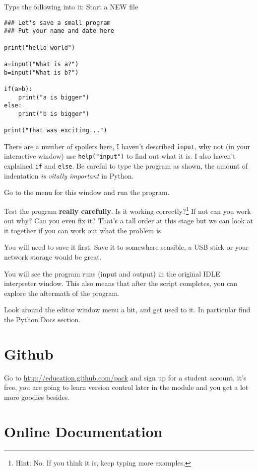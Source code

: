 \documentclass[12pt,oneside]{cttutorial}
\begin{document}
Type the following into it:
\alert{Start a NEW file}

\begin{lstlisting}
### Let's save a small program
### Put your name and date here

print("hello world")

a=input("What is a?")
b=input("What is b?")

if(a>b):
    print("a is bigger")
else:
    print("b is bigger")

print("That was exciting...")
\end{lstlisting}

There are a number of spoilers here, I haven't described \lstinline!input!, why not (in your interactive window) use \lstinline!help("input")! to find out what it is.
I also haven't explained \lstinline!if! and \lstinline!else!. Be careful to type the program as shown, the amount of indentation \emph{is vitally important} in Python.

Go to the menu for this window and run the program. 

Test the program \textbf{really carefully}. Is it working correctly?\footnote{Hint: No. If you think it is, keep typing more examples.} If not can you work out why? Can you even fix it? That's a tall order at this stage but we can look at it together if you can work out what the problem is.

You will need to save it first. Save it to somewhere sensible, a USB stick or your network storage would be great.

You will see the program runs (input and output) in the original IDLE interpreter window. This also means that after the script completes, you can explore the aftermath of the program.

Look around the editor window menu a bit, and get used to it. In particular find the Python Docs section.

\section{Github}

Go to \url{http://education.github.com/pack} and sign up for a student account, it's free, you are going to learn version control later in the module
and you get a lot more goodies besides.

\section{Online Documentation}
\end{document}
